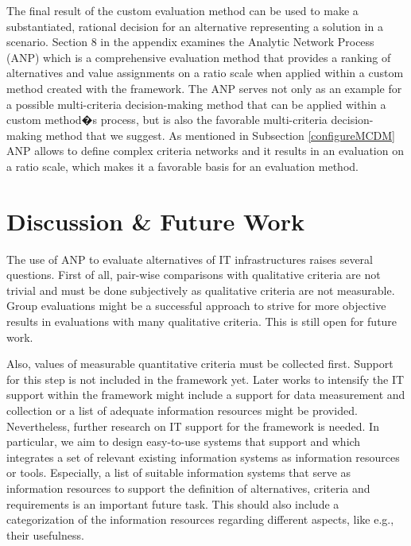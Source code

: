 \documentclass[journal,final,a4paper,twoside]{IEEEtran}
\begin{document}
The final result of the custom evaluation method can be used to make a substantiated, rational decision for an alternative representing a solution in a scenario.
Section 8 in the appendix examines the Analytic Network Process (ANP) which is a comprehensive evaluation method that provides a ranking of alternatives and value assignments on a ratio scale when applied within a custom method created with the  framework. The ANP serves not only as an example for a possible multi-criteria decision-making method that can be applied within a custom method�s process, but is also the favorable multi-criteria decision-making method that we suggest. As mentioned in Subsection \ref{configureMCDM} ANP allows to define complex criteria networks and it results in an evaluation on a ratio scale, which makes it a favorable basis for an evaluation method.


















\section{Discussion \& Future Work}
\label{discussfuture}
The use of ANP to evaluate alternatives of IT infrastructures raises several questions. First of all, pair-wise comparisons with qualitative criteria are not trivial and must be done subjectively as qualitative criteria are not measurable. Group evaluations might be a successful approach to strive for more objective results in evaluations with many qualitative criteria. This is still open for future work.

Also, values of measurable quantitative criteria must be collected first. Support for this step is not included in the framework yet. Later works to intensify the IT support within the framework might include a support for data measurement and collection or a list of adequate information resources might be provided. Nevertheless, further research on IT support for the framework is needed. In particular, we aim to design easy-to-use systems that support  and which integrates a set of relevant existing information systems as information resources or tools. Especially, a list of suitable information systems that serve as information resources to support the definition of alternatives, criteria and requirements is an important future task. This should also include a categorization of the information resources regarding different aspects, like e.g., their usefulness.
\end{document}

